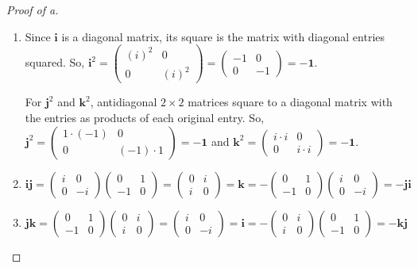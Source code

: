 \documentclass[../hw3]{subfiles}
\begin{document}
\begin{proof}[Proof of a]
	\begin{enumerate}[label=(\roman*)]
		\item Since $\mathbf{i}$ is a diagonal matrix, its square is the matrix with diagonal entries squared.
		      So, $\mathbf{i}^2=\begin{pmatrix} (i)^2 & 0 \\ 0 & (i)^2 \end{pmatrix} = \begin{pmatrix} -1&0\\0&-1 \end{pmatrix} = -\mathbf{1}$.

		      For $\mathbf{j}^2$ and $\mathbf{k}^2$, antidiagonal $2\times 2$ matrices square to a diagonal matrix with the entries as products of each original entry.
		      So, $\mathbf{j}^2=\begin{pmatrix} 1\cdot (-1)&0\\0&(-1)\cdot 1 \end{pmatrix} =-\mathbf{1}$ and $\mathbf{k}^2=\begin{pmatrix} i\cdot i&0\\0&i\cdot i \end{pmatrix} =-\mathbf{1}$.

		\item $\mathbf{i}\mathbf{j}=\begin{pmatrix} i & 0 \\ 0 & -i \end{pmatrix} \begin{pmatrix} 0&1\\-1&0 \end{pmatrix} = \begin{pmatrix} 0 & i \\ i & 0 \end{pmatrix}  = \mathbf{k}= -\begin{pmatrix} 0 & 1 \\ -1 & 0 \end{pmatrix}\begin{pmatrix} i & 0 \\ 0 & -i \end{pmatrix} = -\mathbf{j}\mathbf{i}$

		\item $\mathbf{j}\mathbf{k}=\begin{pmatrix} 0 & 1 \\ -1 & 0 \end{pmatrix}\begin{pmatrix} 0 & i \\ i & 0 \end{pmatrix}=\begin{pmatrix} i & 0 \\ 0 & -i \end{pmatrix}=\mathbf{i}=-\begin{pmatrix} 0 & i \\ i & 0 \end{pmatrix}\begin{pmatrix} 0 & 1 \\ -1 & 0 \end{pmatrix}=-\mathbf{k}\mathbf{j}$


\end{enumerate}
\end{proof}
\end{document}
